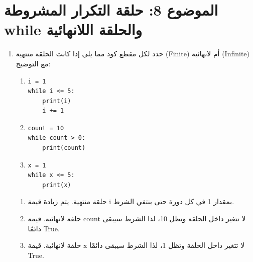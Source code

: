 \documentclass[14pt]{extarticle}
\begin{document}
\section*{الموضوع 8: حلقة التكرار المشروطة \textenglish{while} والحلقة اللانهائية}
\begin{enumerate}[itemsep=3em]

\item
حدد لكل مقطع كود مما يلي إذا كانت الحلقة منتهية (\textenglish{Finite}) أم لانهائية (\textenglish{Infinite}) مع التوضيح:
\begin{enumerate}
    \item
\begin{boxCode}
\begin{english}
\begin{verbatim}
i = 1
while i <= 5:
    print(i)
    i += 1
\end{verbatim}
\end{english}
\end{boxCode}
    \item
\begin{boxCode}
\begin{english}
\begin{verbatim}
count = 10
while count > 0:
    print(count)
\end{verbatim}
\end{english}
\end{boxCode}
    \item
\begin{boxCode}
\begin{english}
\begin{verbatim}
x = 1
while x <= 5:
    print(x)
\end{verbatim}
\end{english}
\end{boxCode}
\end{enumerate}

\ifwithsols
\begin{boxSolution}
\begin{enumerate}
    \item حلقة منتهية. يتم زيادة قيمة \textenglish{i} بمقدار 1 في كل دورة حتى ينتفي الشرط.
    \item حلقة لانهائية. قيمة \textenglish{count} لا تتغير داخل الحلقة وتظل 10، لذا الشرط سيبقى دائمًا \textenglish{True}.
    \item حلقة لانهائية. قيمة \textenglish{x} لا تتغير داخل الحلقة وتظل 1، لذا الشرط سيبقى دائمًا \textenglish{True}.
\end{enumerate}
\end{boxSolution}
\fi


\end{enumerate}
\end{document}

